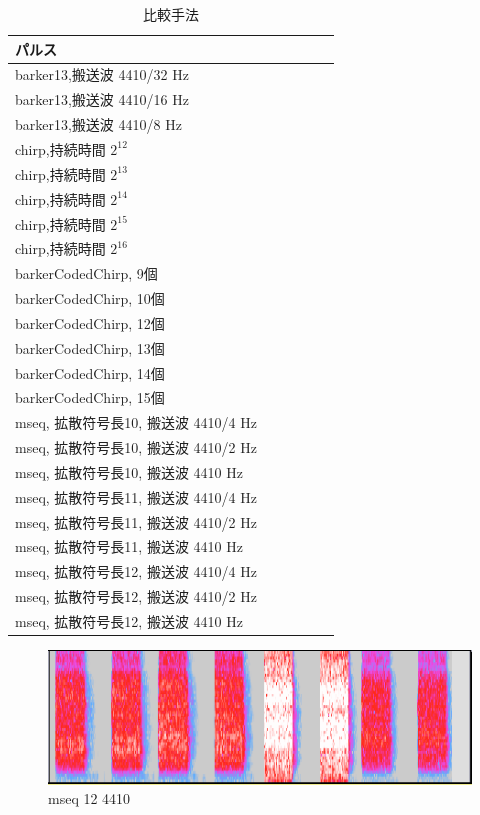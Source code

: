 \begin{table}[p]\centering
  \caption{比較手法}
  \label{tab:hikaku}
  \begin{tabular}{l|rrrrr}
    \hline
    パルス \\
    \hline
    barker13,搬送波 4410/32 Hz   \\
    barker13,搬送波 4410/16 Hz  \\
    barker13,搬送波 4410/8 Hz  \\
    chirp,持続時間 $2^{12}$  \\
    chirp,持続時間 $2^{13}$  \\
    chirp,持続時間 $2^{14}$  \\
    chirp,持続時間 $2^{15}$  \\
    chirp,持続時間 $2^{16}$  \\
    barkerCodedChirp, 9個  \\
    barkerCodedChirp, 10個  \\
    barkerCodedChirp, 12個  \\
    barkerCodedChirp, 13個  \\
    barkerCodedChirp, 14個  \\
    barkerCodedChirp, 15個  \\
    mseq, 拡散符号長10, 搬送波 4410/4 Hz  \\
    mseq, 拡散符号長10, 搬送波 4410/2 Hz  \\
    mseq, 拡散符号長10, 搬送波 4410 Hz  \\
    mseq, 拡散符号長11, 搬送波 4410/4 Hz  \\
    mseq, 拡散符号長11, 搬送波 4410/2 Hz  \\
    mseq, 拡散符号長11, 搬送波 4410 Hz  \\
    mseq, 拡散符号長12, 搬送波 4410/4 Hz  \\
    mseq, 拡散符号長12, 搬送波 4410/2 Hz  \\
    mseq, 拡散符号長12, 搬送波 4410 Hz  \\
    \hline
  \end{tabular}
\end{table}


\clearpage



\begin{figure}[p]
  \centering
  \includegraphics[clip,width=1.05\hsize]{img/mseq_12_4410.png}
  \caption{mseq 12 4410}\label{fig:mseqZ12Z4410}
\end{figure}


